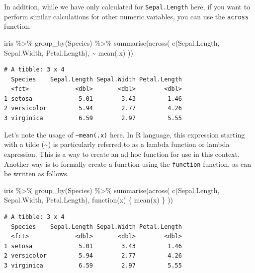 \documentclass[
  a4paper,
]{book}
\newenvironment{Shaded}{\begin{snugshade}}{\end{snugshade}}
\newcommand{\ControlFlowTok}[1]{\textcolor[rgb]{0.00,0.23,0.31}{#1}}
\newcommand{\FunctionTok}[1]{\textcolor[rgb]{0.28,0.35,0.67}{#1}}
\newcommand{\NormalTok}[1]{\textcolor[rgb]{0.00,0.23,0.31}{#1}}
\newcommand{\SpecialCharTok}[1]{\textcolor[rgb]{0.37,0.37,0.37}{#1}}
\begin{document}
In addition, while we have only calculated for \texttt{Sepal.Length}
here, if you want to perform similar calculations for other numeric
variables, you can use the \texttt{across} function.

\begin{Shaded}
\begin{Highlighting}[]
\NormalTok{iris }\SpecialCharTok{\%\textgreater{}\%}
  \FunctionTok{group\_by}\NormalTok{(Species) }\SpecialCharTok{\%\textgreater{}\%}
  \FunctionTok{summarise}\NormalTok{(}\FunctionTok{across}\NormalTok{(}
    \FunctionTok{c}\NormalTok{(Sepal.Length, Sepal.Width, Petal.Length),}
    \SpecialCharTok{\textasciitilde{}} \FunctionTok{mean}\NormalTok{(.x)}
\NormalTok{  ))}
\end{Highlighting}
\end{Shaded}

\begin{verbatim}
# A tibble: 3 x 4
  Species    Sepal.Length Sepal.Width Petal.Length
  <fct>             <dbl>       <dbl>        <dbl>
1 setosa             5.01        3.43         1.46
2 versicolor         5.94        2.77         4.26
3 virginica          6.59        2.97         5.55
\end{verbatim}

Let's note the usage of \texttt{\textasciitilde{}mean(.x)} here. In R
language, this expression starting with a tilde (\textasciitilde) is
particularly referred to as a lambda function or lambda expression. This
is a way to create an ad hoc function for use in this context. Another
way is to formally create a function using the \texttt{function}
function, as can be written as follows.

\begin{Shaded}
\begin{Highlighting}[]
\NormalTok{iris }\SpecialCharTok{\%\textgreater{}\%}
  \FunctionTok{group\_by}\NormalTok{(Species) }\SpecialCharTok{\%\textgreater{}\%}
  \FunctionTok{summarise}\NormalTok{(}\FunctionTok{across}\NormalTok{(}
    \FunctionTok{c}\NormalTok{(Sepal.Length, Sepal.Width, Petal.Length),}
    \ControlFlowTok{function}\NormalTok{(x) \{}
      \FunctionTok{mean}\NormalTok{(x)}
\NormalTok{    \}}
\NormalTok{  ))}
\end{Highlighting}
\end{Shaded}

\begin{verbatim}
# A tibble: 3 x 4
  Species    Sepal.Length Sepal.Width Petal.Length
  <fct>             <dbl>       <dbl>        <dbl>
1 setosa             5.01        3.43         1.46
2 versicolor         5.94        2.77         4.26
3 virginica          6.59        2.97         5.55
\end{verbatim}
\end{document}
